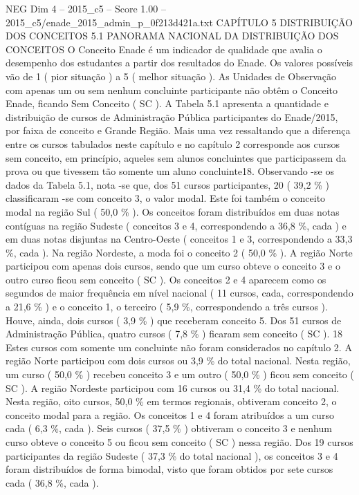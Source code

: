 \begin{textsample}{NEG Dim 4 – 2015\_c5 – Score 1.00 – 2015\_c5/enade\_2015\_admin\_p\_0f213d421a.txt}  \label{ex:f4_neg_188}
CAPÍTULO 5 DISTRIBUIÇÃO DOS CONCEITOS 5.1 PANORAMA NACIONAL DA DISTRIBUIÇÃO DOS CONCEITOS O Conceito Enade é um indicador de qualidade que avalia o desempenho dos estudantes a partir dos resultados do Enade.
Os valores possíveis vão de 1 ( pior situação ) a 5 ( melhor situação ).
As Unidades de Observação com apenas um ou sem nenhum concluinte participante não obtêm o Conceito Enade, ficando Sem Conceito ( SC ).
A Tabela 5.1 apresenta a quantidade e distribuição de cursos de Administração Pública participantes do Enade/2015, por faixa de conceito e Grande Região.
Mais uma vez ressaltando que a diferença entre os cursos tabulados neste capítulo e no capítulo 2 corresponde aos cursos sem conceito, em princípio, aqueles sem alunos concluintes que participassem da prova ou que tivessem tão somente um aluno concluinte18.
Observando -se os dados da Tabela 5.1, nota -se que, dos 51 cursos participantes, 20 ( 39,2 \% ) classificaram -se com conceito 3, o valor modal.
Este foi também o conceito modal na região Sul ( 50,0 \% ).
Os conceitos foram distribuídos em duas notas contíguas na região Sudeste ( conceitos 3 e 4, correspondendo a 36,8 \%, cada ) e em duas notas disjuntas na Centro-Oeste ( conceitos 1 e 3, correspondendo a 33,3 \%, cada ).
Na região Nordeste, a moda foi o conceito 2 ( 50,0 \% ).
A região Norte participou com apenas dois cursos, sendo que um curso obteve o conceito 3 e o outro curso ficou sem conceito ( SC ).
Os conceitos 2 e 4 aparecem como os segundos de maior frequência em nível nacional ( 11 cursos, cada, correspondendo a 21,6 \% ) e o conceito 1, o terceiro ( 5,9 \%, correspondendo a três cursos ).
Houve, ainda, dois cursos ( 3,9 \% ) que receberam conceito 5.
Dos 51 cursos de Administração Pública, quatro cursos ( 7,8 \% ) ficaram sem conceito ( SC ). 18 Estes cursos com somente um concluinte não foram considerados no capítulo 2.
A região Norte participou com dois cursos ou 3,9 \% do total nacional.
Nesta região, um curso ( 50,0 \% ) recebeu conceito 3 e um outro ( 50,0 \% ) ficou sem conceito ( SC ).
A região Nordeste participou com 16 cursos ou 31,4 \% do total nacional.
Nesta região, oito cursos, 50,0 \% em termos regionais, obtiveram conceito 2, o conceito modal para a região.
Os conceitos 1 e 4 foram atribuídos a um curso cada ( 6,3 \%, cada ).
Seis cursos ( 37,5 \% ) obtiveram o conceito 3 e nenhum curso obteve o conceito 5 ou ficou sem conceito ( SC ) nessa região.
Dos 19 cursos participantes da região Sudeste ( 37,3 \% do total nacional ), os conceitos 3 e 4 foram distribuídos de forma bimodal, visto que foram obtidos por sete cursos cada ( 36,8 \%, cada ).

\end{textsample}
